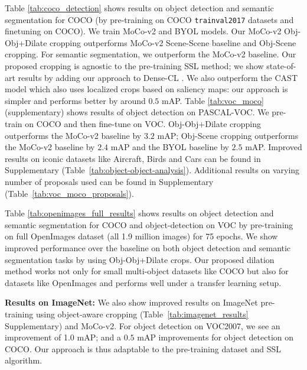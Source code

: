 Table  \ref{tab:coco_detection} shows results on object detection and semantic segmentation for COCO (by pre-training on COCO \texttt{trainval2017} datasets and finetuning on COCO). We train MoCo-v2 and BYOL models. Our MoCo-v2 Obj-Obj+Dilate cropping outperforms MoCo-v2 Scene-Scene baseline and Obj-Scene cropping. For semantic segmentation, we outperform the MoCo-v2 baseline. Our proposed cropping is agnostic to the pre-training SSL method; we show state-of-art results by adding our approach to Dense-CL \citep{wang2021dense}. We also outperform the CAST model \citep{selvaraju2020casting} which also uses localized crops based on saliency maps: our approach is simpler and performs better by around $0.5$ mAP. Table \ref{tab:voc_moco} (supplementary) shows results of object detection on PASCAL-VOC. We pre-train on COCO and then fine-tune on VOC. Obj-Obj+Dilate cropping outperforms the MoCo-v2 baseline by $3.2$ mAP; Obj-Scene cropping outperforms the MoCo-v2 baseline by $2.4$ mAP and the BYOL baseline by $2.5$ mAP. Improved results on iconic datasets like Aircraft, Birds and Cars can be found in Supplementary (Table~\ref{tab:object-object-analysis}). Additional results on varying number of proposals used can be found in Supplementary (Table~\ref{tab:voc_moco_proposals}). 

Table \ref{tab:openimages_full_results} shows results  on object detection and semantic segmentation for COCO and object-detection on VOC by pre-training on full OpenImages dataset \citep{kuznetsova2020open} (all 1.9 million images) for 75 epochs. We show improved performance over the baseline on both object detection and semantic segmentation tasks by using Obj-Obj+Dilate crops. Our proposed dilation method works not only for small multi-object datasets like COCO but also for datasets like OpenImages and performs well under a transfer learning setup.

{\textbf{Results on ImageNet:}} We also show improved results on ImageNet pre-training using object-aware cropping (Table~\ref{tab:imagenet_results} Supplementary) and MoCo-v2. For object detection on VOC2007, we see an improvement of 1.0 mAP; and a $0.5$ mAP improvements for object detection on COCO. Our approach is thus adaptable to the pre-training dataset and SSL algorithm. 




